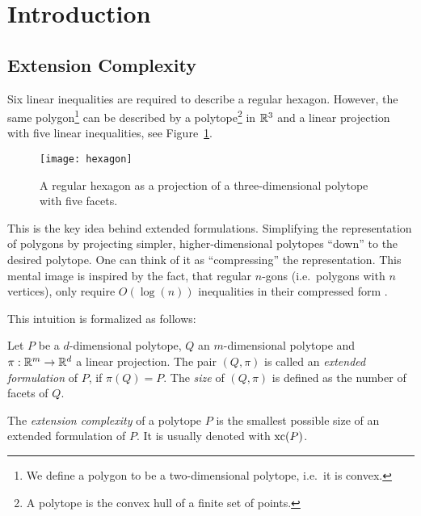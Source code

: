 \section{Introduction}

\subsection{Extension Complexity}

Six linear inequalities are required to describe a regular hexagon. However, the same polygon\footnote{We define a polygon to be a two-dimensional polytope, i.e.\ it is convex.} can be described by a polytope\footnote{A polytope is the convex hull of a finite set of points.} in $\mathbb{R}^3$ and a linear projection with five linear inequalities, see Figure~\ref{fig:hexagon}.

\begin{figure}[ht]
  \centering
  \texttt{[image: hexagon]}
  \caption{A regular hexagon as a projection of a three-dimensional polytope with five facets. \cite[Figure~1]{kwan2020extension}}
  \label{fig:hexagon}
\end{figure}

This is the key idea behind extended formulations. Simplifying the representation of polygons by projecting simpler, higher-dimensional polytopes ``down'' to the desired polytope.
One can think of it as ``compressing'' the representation. This mental image is inspired by the fact, that regular $n$-gons (i.e.\ polygons with $n$ vertices), only require $O(\log(n))$ inequalities in their compressed form \cite{kaibel2010constructing}.

This intuition is formalized as follows:

\begin{definition}
  Let $P$ be a $d$-dimensional polytope, $Q$ an $m$-dimensional polytope and $\pi:\mathbb{R}^m \to \mathbb{R}^d$ a linear projection.
  The pair $(Q,\pi)$ is called an \emph{extended formulation} of $P$, if $\pi(Q)=P$. The \emph{size} of $(Q,\pi)$ is defined as the number of facets of $Q$.
\end{definition}

\begin{definition}
  The \emph{extension complexity} of a polytope $P$ is the smallest possible size of an extended formulation of $P$. It is usually denoted with $\operatorname{xc}(P)$.
\end{definition}

